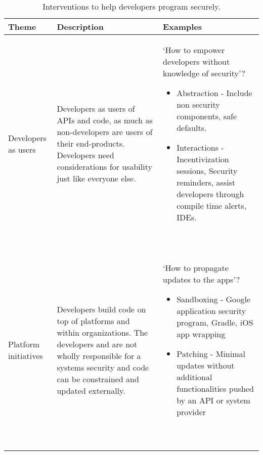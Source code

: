 \documentclass[conference]{IEEEtran}
\newcommand{\tblheader}[1]{#1}
\begin{document}
\begin{table*}
  \caption{Interventions to help developers program securely.} 
  \label{tab:interventions}
  \begin{tabular}{p{} p{} p{}}
    \toprule
    \tblheader{Theme} & \tblheader{Description} & \tblheader{Examples} \\
    \midrule
    Developers as users & Developers as users of APIs and code, as much as non-developers are users of their end-products.  Developers need considerations for usability just like everyone else. & 
    `How to empower developers without knowledge of security'?
    \begin{itemize}
    \item Abstraction - Include non security components, safe defaults. 
    \item Interactions - Incentivization sessions, Security reminders, assist developers through compile time alerts, IDEs. 
    \end{itemize}
                                                                                                                                                   ~\cite{acar2016,smithgreen2016,yskout2012,pugh2008,weir2016,adoption2014,witschey2015,jose2016,tondel2008,haney2018,thomas2018,poller2017,zhuaside2013,nguyen2017,rashid2019}\\
    \addlinespace

    Platform initiatives & Developers build code on top of platforms and within organizations.  The developers and are not wholly responsible for a systems security and code can be constrained and updated externally. & `How to propagate updates to the apps'?
    \begin{itemize}
    \item Sandboxing - Google application security program, Gradle, iOS app wrapping
    \item Patching - Minimal updates without additional functionalities pushed by an API or system provider
    \end{itemize}
                                                                                                                                  ~\cite{nadijava2016, whitney2015,baset2017}\\
    \addlinespace


\end{tabular}
\end{table*}
\end{document}
